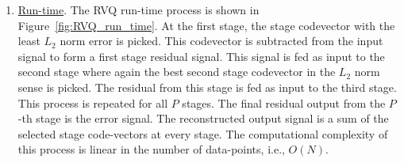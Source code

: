 \begin{enumerate}
\item \underline{Run-time}.  The RVQ run-time process is shown in Figure~\ref{fig:RVQ_run_time}.  At the first stage, the stage codevector with the least $L_2$ norm error is picked.  This codevector is subtracted from the input signal to form a first stage residual signal.  This signal is fed as input to the second stage where again the best second stage codevector in the $L_2$ norm sense is picked.  The residual from this stage is fed as input to the third stage.  This process is repeated for all $P$ stages.  The final residual output from the $P$-th stage is the error signal.  The reconstructed output signal is a sum of the selected stage code-vectors at every stage.  The computational complexity of this process is linear in the number of data-points, i.e., $O(N)$.  



\end{enumerate} 


%
%













